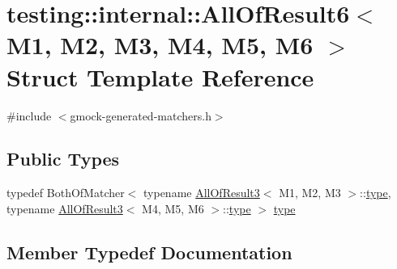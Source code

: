 \hypertarget{structtesting_1_1internal_1_1AllOfResult6}{}\section{testing\+::internal\+::All\+Of\+Result6$<$ M1, M2, M3, M4, M5, M6 $>$ Struct Template Reference}
\label{structtesting_1_1internal_1_1AllOfResult6}


{\ttfamily \#include $<$gmock-\/generated-\/matchers.\+h$>$}

\subsection*{Public Types}
\begin{DoxyCompactItemize}
\item 
typedef Both\+Of\+Matcher$<$ typename \mbox{\hyperlink{structtesting_1_1internal_1_1AllOfResult3}{All\+Of\+Result3}}$<$ M1, M2, M3 $>$\+::\mbox{\hyperlink{structtesting_1_1internal_1_1AllOfResult6_a5385655911ce2c1d3fccd802c1754139}{type}}, typename \mbox{\hyperlink{structtesting_1_1internal_1_1AllOfResult3}{All\+Of\+Result3}}$<$ M4, M5, M6 $>$\+::\mbox{\hyperlink{structtesting_1_1internal_1_1AllOfResult6_a5385655911ce2c1d3fccd802c1754139}{type}} $>$ \mbox{\hyperlink{structtesting_1_1internal_1_1AllOfResult6_a5385655911ce2c1d3fccd802c1754139}{type}}
\end{DoxyCompactItemize}


\subsection{Member Typedef Documentation}
\mbox{\label{structtesting_1_1internal_1_1AllOfResult6_a5385655911ce2c1d3fccd802c1754139}} 
